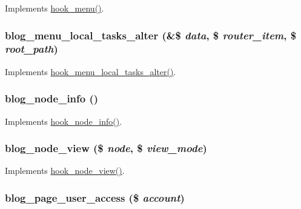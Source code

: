Implements \hyperlink{group__hooks_ga5c95244fea59b25666e409759e133ded}{hook\_\-menu()}. \hypertarget{blog_8module_a333ae4f21d19d83ebf67eb1ebe327cac}{
\subsubsection[{blog\_\-menu\_\-local\_\-tasks\_\-alter}]{\setlength{\rightskip}{0pt plus 5cm}blog\_\-menu\_\-local\_\-tasks\_\-alter (\&\$ {\em data}, \/  \$ {\em router\_\-item}, \/  \$ {\em root\_\-path})}}
\label{blog_8module_a333ae4f21d19d83ebf67eb1ebe327cac}
Implements \hyperlink{group__hooks_gac828fb6b28f1a8bb01c444a9b2331f5f}{hook\_\-menu\_\-local\_\-tasks\_\-alter()}. \hypertarget{blog_8module_a507d5bb1a9160b40f638c8a9185d5a7d}{
\subsubsection[{blog\_\-node\_\-info}]{\setlength{\rightskip}{0pt plus 5cm}blog\_\-node\_\-info ()}}
\label{blog_8module_a507d5bb1a9160b40f638c8a9185d5a7d}
Implements \hyperlink{group__node__api__hooks_ga3b6ad51d7815d1cdd093b0e0f350cbd0}{hook\_\-node\_\-info()}. \hypertarget{blog_8module_aef07831d7585949a6c1fffae85571598}{
\subsubsection[{blog\_\-node\_\-view}]{\setlength{\rightskip}{0pt plus 5cm}blog\_\-node\_\-view (\$ {\em node}, \/  \$ {\em view\_\-mode})}}
\label{blog_8module_aef07831d7585949a6c1fffae85571598}
Implements \hyperlink{group__node__api__hooks_ga475290ee8e81a2373ea17c512cc3f9a9}{hook\_\-node\_\-view()}. \hypertarget{blog_8module_a213af875712242031b407a11e973e1db}{
\subsubsection[{blog\_\-page\_\-user\_\-access}]{\setlength{\rightskip}{0pt plus 5cm}blog\_\-page\_\-user\_\-access (\$ {\em account})}}
